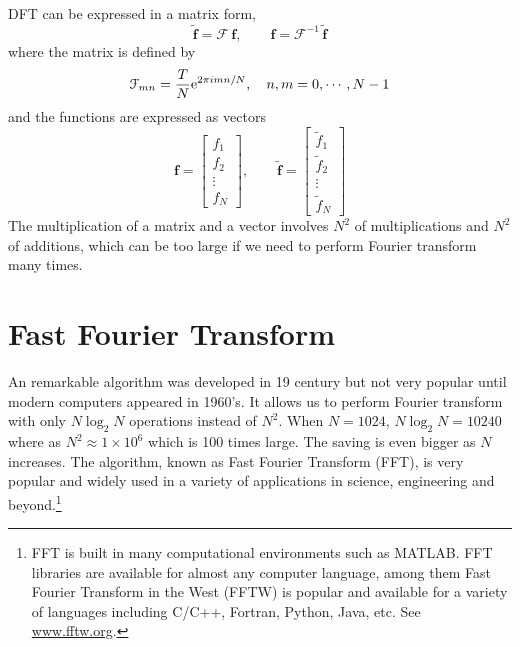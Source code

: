 DFT can be expressed in a matrix form,
\begin{equation}\label{eq:DFT_matrix}
\tilde{\mathbf{f}} = \mathcal{F}\, \mathbf{f}, \qquad \mathbf{f} = \mathcal{F}^{-1}\, \tilde{\mathbf{f}}
\end{equation}
where the matrix is defined by
\begin{equation}
\mathcal{F}_{mn} = \frac{T}{N}  \text{e}^{2\pi i m n/N}, \quad n,m = 0, \cdots, N-1
\end{equation}
and the functions are expressed as vectors
\begin{equation}
\mathbf{f} = \begin{bmatrix}
f_1 \\ f_2 \\ \vdots \\ f_N
\end{bmatrix}, \qquad
\tilde{\mathbf{f}} = \begin{bmatrix}
\tilde{f}_1 \\ \tilde{f}_2 \\ \vdots \\ \tilde{f}_N
\end{bmatrix}
\end{equation}
The multiplication of a matrix and a vector involves $N^2$ of multiplications and $N^2$ of additions, which can be too large if we need to perform Fourier transform many times.

\section{Fast Fourier Transform}

An remarkable algorithm was developed in 19 century but not very popular until modern computers appeared in 1960's.
It allows us to perform Fourier transform with only $N \log_2 N$ operations instead of $N^2$.  When $N=1024$,
$N \log_2 N = 10240$ where as $N^2 \approx 1 \times 10^{6}$ which is 100 times large. The saving is even bigger as $N$ increases.
The algorithm, known as Fast Fourier Transform (FFT), is very popular and widely used in a variety of applications in science, engineering and beyond.\footnote{FFT is built in many computational environments such as MATLAB.  FFT libraries are available for almost any computer language, among them Fast Fourier Transform in the West (FFTW) is popular and available for a variety of languages including C/C++, Fortran, Python, Java, etc.  See \url{www.fftw.org}.}

